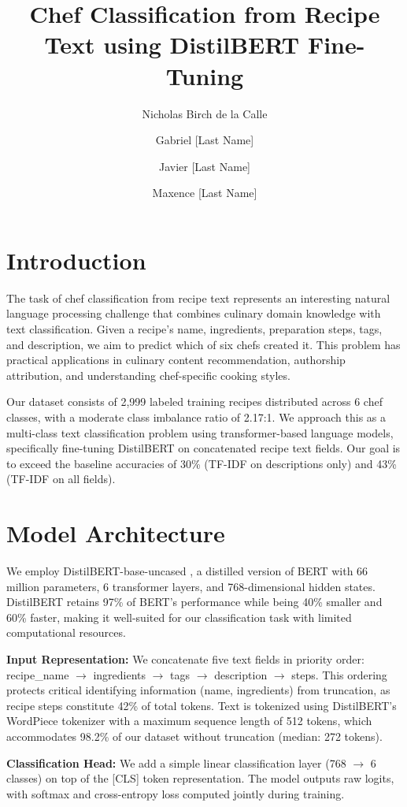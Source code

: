 \documentclass[twocolumn,10pt]{article}
\title{Chef Classification from Recipe Text using DistilBERT Fine-Tuning}
\author{Nicholas Birch de la Calle}
\author{Gabriel [Last Name]}
\author{Javier [Last Name]}
\author{Maxence [Last Name]}
\affil{Group 2\\ Instituto Superior Técnico, Universidade de Lisboa}
\begin{document}
\maketitle

\section{Introduction}

The task of chef classification from recipe text represents an interesting natural language processing challenge that combines culinary domain knowledge with text classification. Given a recipe's name, ingredients, preparation steps, tags, and description, we aim to predict which of six chefs created it. This problem has practical applications in culinary content recommendation, authorship attribution, and understanding chef-specific cooking styles.

Our dataset consists of 2,999 labeled training recipes distributed across 6 chef classes, with a moderate class imbalance ratio of 2.17:1. We approach this as a multi-class text classification problem using transformer-based language models, specifically fine-tuning DistilBERT on concatenated recipe text fields. Our goal is to exceed the baseline accuracies of 30\% (TF-IDF on descriptions only) and 43\% (TF-IDF on all fields).

\section{Model Architecture}

We employ DistilBERT-base-uncased \cite{sanh2019distilbert}, a distilled version of BERT with 66 million parameters, 6 transformer layers, and 768-dimensional hidden states. DistilBERT retains 97\% of BERT's performance while being 40\% smaller and 60\% faster, making it well-suited for our classification task with limited computational resources.

\textbf{Input Representation:} We concatenate five text fields in priority order: recipe\_name $\rightarrow$ ingredients $\rightarrow$ tags $\rightarrow$ description $\rightarrow$ steps. This ordering protects critical identifying information (name, ingredients) from truncation, as recipe steps constitute 42\% of total tokens. Text is tokenized using DistilBERT's WordPiece tokenizer with a maximum sequence length of 512 tokens, which accommodates 98.2\% of our dataset without truncation (median: 272 tokens).

\textbf{Classification Head:} We add a simple linear classification layer (768 $\rightarrow$ 6 classes) on top of the [CLS] token representation. The model outputs raw logits, with softmax and cross-entropy loss computed jointly during training.
\end{document}
